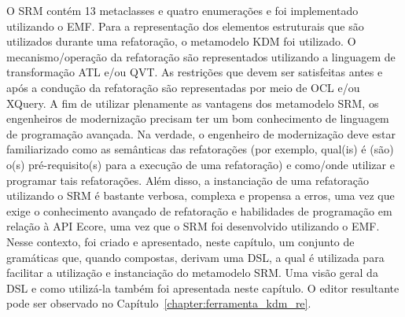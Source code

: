 O SRM contém 13 metaclasses e quatro enumerações e foi implementado utilizando o EMF. Para a representação dos elementos estruturais que são utilizados durante uma refatoração, o metamodelo KDM foi utilizado. O mecanismo/operação da refatoração são representados utilizando a linguagem de transformação ATL e/ou QVT. As restrições que devem ser satisfeitas antes e após a condução da refatoração são representadas por meio de OCL e/ou XQuery. A fim de utilizar plenamente as vantagens dos metamodelo SRM, os engenheiros de modernização precisam ter um bom conhecimento de linguagem de programação avançada. Na verdade, o engenheiro de modernização deve estar familiarizado como as semânticas das refatorações (por exemplo, qual(is) é (são) o(s) pré-requisito(s) para a execução de uma refatoração) e como/onde utilizar e programar tais refatorações. Além disso, a instanciação de uma refatoração utilizando o SRM é bastante verbosa, complexa e propensa a erros, uma vez que exige o conhecimento avançado de refatoração e habilidades de programação em relação à API Ecore, uma vez que o SRM foi desenvolvido utilizando o EMF. Nesse contexto, foi criado e apresentado, neste capítulo, um conjunto de gramáticas que, quando compostas, derivam uma DSL, a qual é utilizada para facilitar a utilização e instanciação do metamodelo SRM. Uma visão geral da DSL e como utilizá-la também foi apresentada neste capítulo. O editor resultante pode ser observado no Capítulo~\ref{chapter:ferramenta_kdm_re}. %

